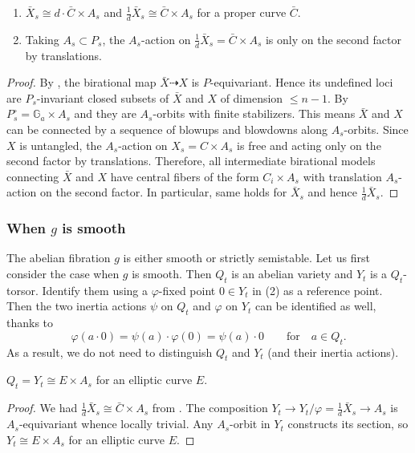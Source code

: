\documentclass[reqno, letterpaper]{amsart}
\numberwithin{equation}{subsection}
\let\to\longrightarrow
\newcommand{\GG}{\mathbb{G}}
\begin{document}
		\begin{lemma} \label{lem:semistable reduction theorem:splitting}
			\begin{enumerate}
				\item $\bar X_s \cong d \cdot \bar C \times A_s$ and $\frac{1}{d} \bar X_s \cong \bar C \times A_s$ for a proper curve $\bar C$.
				\item Taking $A_s \subset P_s$, the $A_s$-action on $\frac{1}{d} \bar X_s = \bar C \times A_s$ is only on the second factor by translations.
			\end{enumerate}
		\end{lemma}
		\begin{proof}
			By , the birational map $\bar X \dashrightarrow X$ is $P$-equivariant. Hence its undefined loci are $P_s$-invariant closed subsets of $\bar X$ and $X$ of dimension $\le n-1$. By $P^\circ_s = \GG_a \times A_s$ and  they are $A_s$-orbits with finite stabilizers. This means $\bar X$ and $X$ can be connected by a sequence of blowups and blowdowns along $A_s$-orbits. Since $X$ is untangled, the $A_s$-action on $X_s = C \times A_s$ is free and acting only on the second factor by translations. Therefore, all intermediate birational models connecting $\bar X$ and $X$ have central fibers of the form $C_i \times A_s$ with translation $A_s$-action on the second factor. In particular, same holds for $\bar X_s$ and hence $\frac{1}{d} \bar X_s$.
		\end{proof}
		
		
		
		\subsubsection{When $g$ is smooth}
			The abelian fibration $g$ is either smooth or strictly semistable. Let us first consider the case when $g$ is smooth. Then $Q_t$ is an abelian variety and $Y_t$ is a $Q_t$-torsor. Identify them using a $\varphi$-fixed point $0 \in Y_t$ in (2) as a reference point. Then the two inertia actions $\psi$ on $Q_t$ and $\varphi$ on $Y_t$ can be identified as well, thanks to 
			\[ \varphi(a \cdot 0) = \psi(a) \cdot \varphi(0) = \psi(a) \cdot 0 \qquad\mbox{for}\quad a \in Q_t .\]
			As a result, we do not need to distinguish $Q_t$ and $Y_t$ (and their inertia actions).
			
			\begin{lemma} \label{lem:semistable reduction theorem:Qt splits}
				$Q_t = Y_t \cong E \times A_s$ for an elliptic curve $E$. 
			\end{lemma}
			\begin{proof}
				We had $\frac{1}{d} \bar X_s \cong \bar C \times A_s$ from . The composition $Y_t \to Y_t / \varphi = \frac{1}{d} \bar X_s \to A_s$ is $A_s$-equivariant whence locally trivial. Any $A_s$-orbit in $Y_t$ constructs its section, so $Y_t \cong E \times A_s$ for an elliptic curve $E$.
			\end{proof}
			
\end{document}
